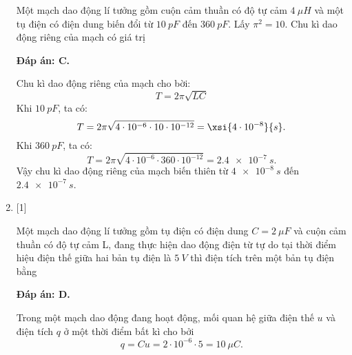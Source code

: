 \begin{enumerate}[label=\bfseries Câu \arabic*:]
	\cauhoi
	{Một mạch dao động lí tưởng gồm cuộn cảm thuần có độ tự cảm $\SI{4}{\mu H}$ và một tụ điện có điện dung biến đổi từ $\SI{10}{pF}$ đến $\SI{360}{pF}$. Lấy $\pi^2 = 10$. Chu kì dao động riêng của mạch có giá trị
	}
	
	\loigiai
	{		\textbf{Đáp án: C.}
		
Chu kì dao động riêng của mạch cho bời:
$$
T=2 \pi \sqrt{L C}
$$
Khi $\SI{10}{pF}$, ta có:
$$
T=2 \pi \sqrt{4\cdot10^{-6} \cdot 10\cdot10^{-12}}= \xsi{4\cdot10^{-8}}{s}.
$$
Khi $\SI{360}{pF}$, ta có:
$$
T=2 \pi \sqrt{4\cdot10^{-6} \cdot 360\cdot10^{-12}}= \SI{2,4 e-7}{s}.
$$
Vậy chu kì dao động riêng của mạch biến thiên từ $\SI{4 e-8}{s}$ đến $\SI{2,4 e-7}{s}$.
		
	}

	\item {} [1]
	
	\cauhoi
	{Một mạch dao động lí tưởng gồm tụ điện có điện dung $C = \SI{2}{\mu F}$ và cuộn cảm thuần có độ tự cảm L, đang thực hiện dao động điện từ tự do tại thời điểm hiệu điện thế giữa hai bản tụ điện là $\SI{5}{V}$ thì điện tích trên một bản tụ điện bằng
	}
	
	\loigiai
	{		\textbf{Đáp án: D.}
		
Trong một mạch dao động đang hoạt động, mối quan hệ giữa điện thế $u$ và điện tích $q$ ở một thời điểm bất kì cho bởi
$$
q=C u=2\cdot10^{-6} \cdot 5=\SI{10}{\mu C}.
$$
		
}
\end{enumerate}
